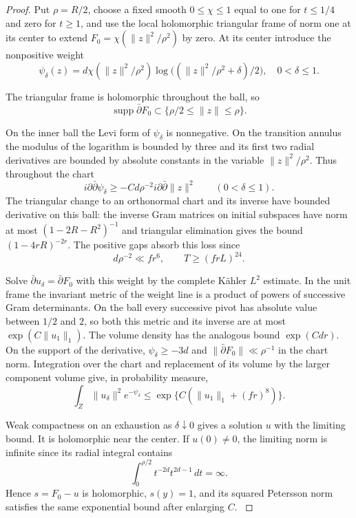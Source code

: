 \begin{proof}
Put \(\rho=R/2\), choose a fixed smooth \(0\le\chi\le1\) equal to one for \(t\le1/4\) and zero for \(t\ge1\), and use the local holomorphic triangular frame of norm one at its center to extend \(F_0=\chi(\|z\|^2/\rho^2)\) by zero. At its center introduce the nonpositive weight
\[
 \psi_\delta(z)=d\chi(\|z\|^2/\rho^2)
          \log\big((\|z\|^2/\rho^2+\delta)/2\big),\quad 0<\delta\le1 .
\]

The triangular frame is holomorphic throughout the ball, so
\[
   \operatorname{supp}\bar\partial F_0
       \subset\{\rho/2\le\|z\|\le\rho\}.
\]

On the inner ball the Levi form of \(\psi_\delta\) is nonnegative. On the transition annulus the modulus of the logarithm is bounded by three and its first two radial derivatives are bounded by absolute constants in the variable \(\|z\|^2/\rho^2\). Thus throughout the chart
\[
  i\partial\bar\partial\psi_\delta
       \ge-Cd\rho^{-2}i\partial\bar\partial\|z\|^2
       \qquad(0<\delta\le1).
\]
 The triangular change to an orthonormal chart and its inverse have bounded derivative on this ball: the inverse Gram matrices on initial subspaces have norm at most \((1-2R-R^2)^{-1}\) and triangular elimination gives the bound \((1-4rR)^{-2r}\). The positive gaps absorb this loss since
\[
          d\rho^{-2}\ll fr^6,\qquad T\ge (frL)^{24}.
\]

Solve \(\bar\partial u_\delta=\bar\partial F_0\) with this weight by the complete Kähler \(L^2\) estimate. In the unit frame the invariant metric of the weight line is a product of powers of successive Gram determinants. On the ball every successive pivot has absolute value between \(1/2\) and \(2\), so both this metric and its inverse are at most \(\exp(C\|u_1\|_1)\). 
The volume density has the analogous bound \(\exp(Cdr)\). On the support of the derivative, \(\psi_\delta\ge-3d\) and \(\|\bar\partial F_0\|\ll\rho^{-1}\) in the chart norm. Integration over the chart and replacement of its volume by the larger component volume give, in probability measure,
\[
       \int_Z\|u_\delta\|^2e^{-\psi_\delta}
       \le \exp\{C(\|u_1\|_1+(fr)^8)\}.
\]

Weak compactness on an exhaustion as \(\delta\downarrow0\) gives a solution \(u\) with the limiting bound. It is holomorphic near the center. If \(u(0)\ne0\), the limiting norm is infinite since its radial integral contains
\[
           \int_0^{\rho/2} t^{-2d} t^{2d-1}\,dt=\infty .
\]
 Hence \(s=F_0-u\) is holomorphic, \(s(y)=1\), and its squared Petersson norm satisfies the same exponential bound after enlarging \(C\). \cite[Theorem~5.1]{demailly-complete-kahler} \cite{hormander-slice}


\end{proof}
